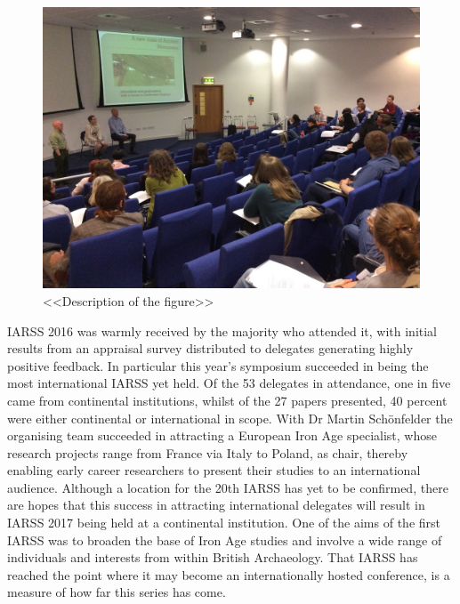 \documentclass[ngerman,english]{ijsra}
\begin{document}
\begin{figure}
\includegraphics[width=\linewidth]{figures/IARSS_Conference3}
\caption{<<Description of the figure>>}
\label{fig:IARSS_Conference3}
\end{figure} 
IARSS 2016 was warmly received by the majority who attended it, with initial results from an appraisal survey distributed to delegates generating highly positive feedback. In particular this year’s symposium succeeded in being the most international IARSS yet held. Of the 53 delegates in attendance, one in five came from continental institutions, whilst of the 27 papers presented, 40 percent were either continental or international in scope. With Dr Martin Schönfelder the organising team succeeded in attracting a European Iron Age specialist, whose research projects range from France via Italy to Poland, as chair, thereby enabling early career researchers to present their studies to an international audience. Although a location for the 20th IARSS has yet to be confirmed, there are hopes that this success in attracting international delegates will result in IARSS 2017 being held at a continental institution. One of the aims of the first IARSS was to broaden the base of Iron Age studies and involve a wide range of individuals and interests from within British Archaeology. That IARSS has reached the point where it may become an internationally hosted conference, is a measure of how far this series has come.
\end{document}
